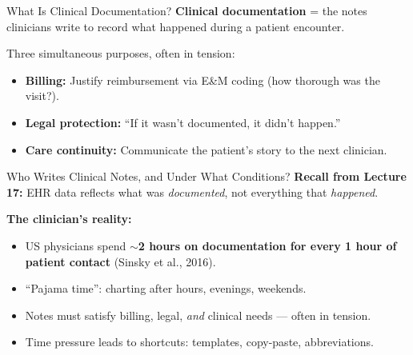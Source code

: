 \documentclass[aspectratio=169,11pt]{beamer}
\begin{document}
\begin{frame}{What Is Clinical Documentation?}
\textbf{Clinical documentation} = the notes clinicians write to record what happened during a patient encounter.

\pause
\vspace{0.3em}
Three simultaneous purposes, often in tension:
\begin{itemize}[<+->]\setlength\itemsep{0.1em}
  \item \textbf{Billing:} Justify reimbursement via E\&M coding (how thorough was the visit?).
  \item \textbf{Legal protection:} ``If it wasn't documented, it didn't happen.''
  \item \textbf{Care continuity:} Communicate the patient's story to the next clinician.
\end{itemize}

\end{frame}

\begin{frame}{Who Writes Clinical Notes, and Under What Conditions?}
\textbf{Recall from Lecture 17:} EHR data reflects what was \emph{documented}, not everything that \emph{happened}.

\vspace{0.3em}
\textbf{The clinician's reality:}
\begin{itemize}[<+->]\setlength\itemsep{0.05em}
  \item US physicians spend \textbf{$\sim$2 hours on documentation for every 1 hour of patient contact} (Sinsky et al., 2016).
  \item ``Pajama time'': charting after hours, evenings, weekends.
  \item Notes must satisfy billing, legal, \emph{and} clinical needs --- often in tension.
  \item Time pressure leads to shortcuts: templates, copy-paste, abbreviations.
\end{itemize}
\end{frame}
\end{document}
